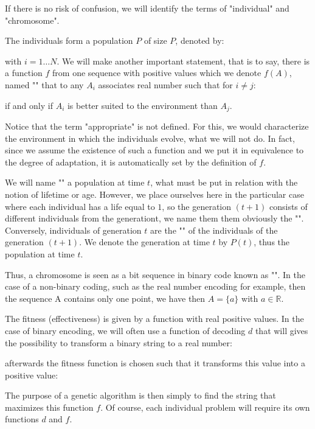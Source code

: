 	If there is no risk of confusion, we will identify the terms of "individual" and "chromosome".

	The individuals form a population $P$ of size $P$, denoted by:
	
	with $i=1\ldots N$.
	We will make another important statement, that is to say, there is a function $f$ from one sequence with positive values which we denote $f(A)$, named "" that to any $A_i$ associates real number such that for $i\neq j$:
	
	if and only if $A_i$ is better suited to the environment than $A_j$.

	Notice that the term "appropriate" is not defined. For this, we would characterize the environment in which the individuals evolve, what we will not do. In fact, since we assume the existence of such a function and we put it in equivalence to the degree of adaptation, it is automatically set by the definition of $f$.

	We will name "" a population at time $t$, what must be put in relation with the notion of lifetime or age. However, we place ourselves here in the particular case where each individual has a life equal to $1$, so the generation $(t + 1)$ consists of different individuals from the generation$ $t, we name them them obviously the "". Conversely, individuals of generation $t$ are the "" of the individuals of the generation $(t + 1)$. We denote the generation at time $t$ by $P(t)$, thus the population at time $t$.

	Thus, a chromosome is seen as a bit sequence in binary code known as "". In the case of a non-binary coding, such as the real number encoding for example, then the sequence A contains only one point, we have then $A=\{a\}$ with $a\in\mathbb{R}$. 
	
	\begin{tcolorbox}[title=Remark,colframe=black,arc=10pt]
	The fitness (effectiveness) is given by a function with real positive values. In the case of binary encoding, we will often use a function of decoding $d$ that will gives the possibility to transform  a binary string to a real number:
	
	afterwards the fitness function is chosen such that it transforms this value into a positive value:
	
	\end{tcolorbox}	
	The purpose of a genetic algorithm is then simply to find the string that maximizes this function $f$. Of course, each individual problem will require its own functions $d$ and $f$.

